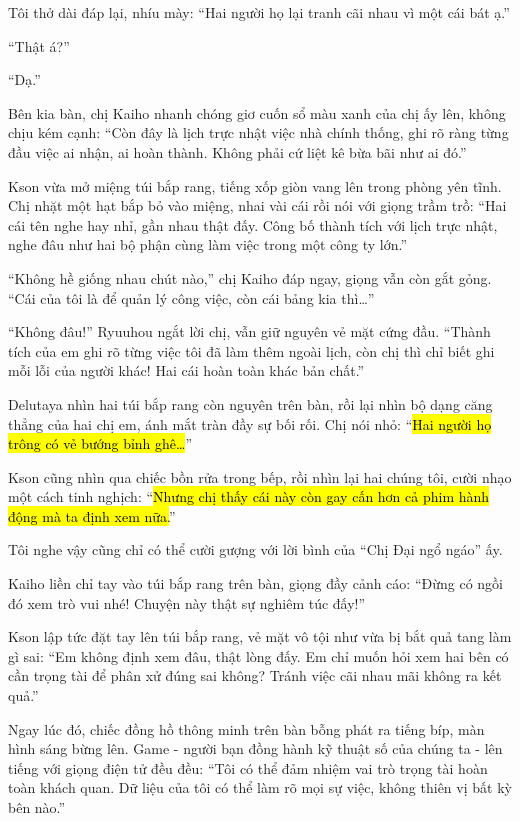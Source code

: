\documentclass[../main.tex]{subfiles}
\begin{document}
Tôi thở dài đáp lại, nhíu mày: ``Hai người họ lại tranh cãi nhau vì một cái bát ạ.''

``Thật á?''

``Dạ.''

Bên kia bàn, chị Kaiho nhanh chóng giơ cuốn sổ màu xanh của chị ấy lên, không chịu kém cạnh: ``Còn đây là lịch trực nhật việc nhà chính thống, ghi rõ ràng từng đầu việc ai nhận, ai hoàn thành. Không phải cứ liệt kê bừa bãi như ai đó.''

Kson vừa mở miệng túi bắp rang, tiếng xốp giòn vang lên trong phòng yên tĩnh. Chị nhặt một hạt bắp bỏ vào miệng, nhai vài cái rồi nói với giọng trầm trồ: ``Hai cái tên nghe hay nhỉ, gần nhau thật đấy. Công bố thành tích với lịch trực nhật, nghe đâu như hai bộ phận cùng làm việc trong một công ty lớn.''

``Không hề giống nhau chút nào,'' chị Kaiho đáp ngay, giọng vẫn còn gắt gỏng. ``Cái của tôi là để quản lý công việc, còn cái bảng kia thì\dots''

``Không đâu!'' Ryuuhou ngắt lời chị, vẫn giữ nguyên vẻ mặt cứng đầu. ``Thành tích của em ghi rõ từng việc tôi đã làm thêm ngoài lịch, còn chị thì chỉ biết ghi mỗi lỗi của người khác! Hai cái hoàn toàn khác bản chất.''

Delutaya nhìn hai túi bắp rang còn nguyên trên bàn, rồi lại nhìn bộ dạng căng thẳng của hai chị em, ánh mắt tràn đầy sự bối rối. Chị nói nhỏ: ``\hl{Hai người họ trông có vẻ bướng bỉnh ghê\dots}''

Kson cũng nhìn qua chiếc bồn rửa trong bếp, rồi nhìn lại hai chúng tôi, cười nhạo một cách tinh nghịch: ``\hl{Nhưng chị thấy cái này còn gay cấn hơn cả phim hành động mà ta định xem nữa.}''

Tôi nghe vậy cũng chỉ có thể cười gượng với lời bình của ``Chị Đại ngổ ngáo'' ấy.

Kaiho liền chỉ tay vào túi bắp rang trên bàn, giọng đầy cảnh cáo: ``Đừng có ngồi đó xem trò vui nhé! Chuyện này thật sự nghiêm túc đấy!''

Kson lập tức đặt tay lên túi bắp rang, vẻ mặt vô tội như vừa bị bắt quả tang làm gì sai: ``Em không định xem đâu, thật lòng đấy. Em chỉ muốn hỏi xem hai bên có cần trọng tài để phân xử đúng sai không? Tránh việc cãi nhau mãi không ra kết quả.''

Ngay lúc đó, chiếc đồng hồ thông minh trên bàn bỗng phát ra tiếng bíp, màn hình sáng bừng lên. Game - người bạn đồng hành kỹ thuật số của chúng ta - lên tiếng với giọng điện tử đều đều: ``Tôi có thể đảm nhiệm vai trò trọng tài hoàn toàn khách quan. Dữ liệu của tôi có thể làm rõ mọi sự việc, không thiên vị bất kỳ bên nào.''
\end{document}
